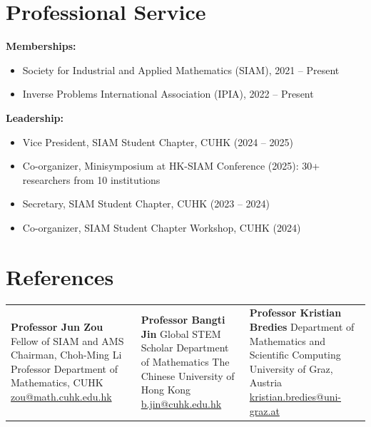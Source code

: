 \documentclass[11pt,a4paper]{article}
\begin{document}
\section{Professional Service}

\textbf{Memberships:}
\begin{itemize}[nosep, leftmargin=1.5em]
    \item Society for Industrial and Applied Mathematics (SIAM), 2021 -- Present
    \item Inverse Problems International Association (IPIA), 2022 -- Present
\end{itemize}

\noindent\textbf{Leadership:}
\begin{itemize}[nosep, leftmargin=1.5em]
    \item Vice President, SIAM Student Chapter, CUHK (2024 -- 2025)
    \item Co-organizer, Minisymposium at HK-SIAM Conference (2025): 30+ researchers from 10 institutions
    \item Secretary, SIAM Student Chapter, CUHK (2023 -- 2024)
    \item Co-organizer, SIAM Student Chapter Workshop, CUHK (2024)
\end{itemize}

\section{References}

\noindent\begin{tabular}{@{}p{}p{}p{}@{}}
\raggedright\textbf{Professor Jun Zou}\newline
Fellow of SIAM and AMS\newline
Chairman, Choh-Ming Li Professor\newline
Department of Mathematics, CUHK\newline
\href{mailto:zou@math.cuhk.edu.hk}{zou@math.cuhk.edu.hk}
&
\raggedright\textbf{Professor Bangti Jin}\newline
Global STEM Scholar\newline
Department of Mathematics\newline
The Chinese University of Hong Kong\newline
\href{mailto:b.jin@cuhk.edu.hk}{b.jin@cuhk.edu.hk}
&
\raggedright\textbf{Professor Kristian Bredies}\newline
Department of Mathematics and Scientific Computing\newline
University of Graz, Austria\newline
\href{mailto:kristian.bredies@uni-graz.at}{kristian.bredies@uni-graz.at}
\end{tabular}
\end{document}
